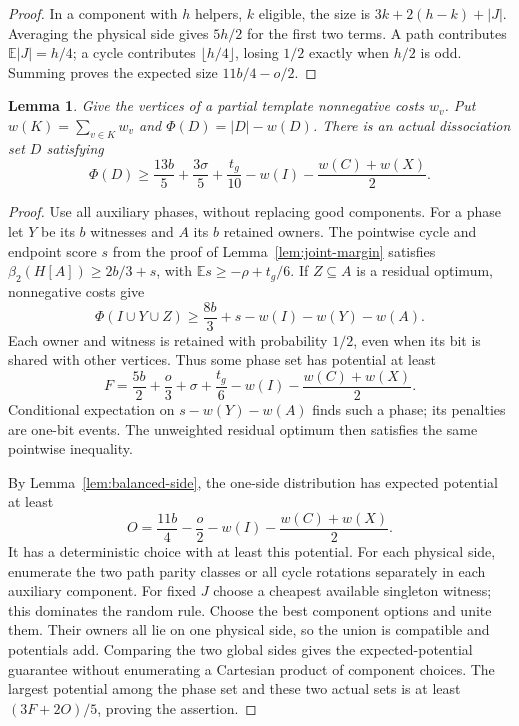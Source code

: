 \documentclass[11pt]{article}
\newtheorem{lemma}[theorem]{Lemma}
\newcommand{\diss}{\beta_2}
\begin{document}
\begin{proof}
In a component with $h$ helpers, $k$ eligible, the size is
$3k+2(h-k)+|J|$. Averaging the physical side gives $5h/2$ for the
first two terms. A path contributes $\mathbb E|J|=h/4$; a cycle
contributes $\lfloor h/4\rfloor$, losing $1/2$ exactly when $h/2$
is odd. Summing proves the expected size $11b/4-o/2$.
\end{proof}

\begin{lemma}\label{lem:vertex-penalties}
Give the vertices of a partial template nonnegative costs $w_v$. Put
$w(K)=\sum_{v\in K}w_v$ and $\Phi(D)=|D|-w(D)$.
There is an actual dissociation set $D$ satisfying
\[
 \Phi(D)\ge\frac{13b}{5}+\frac{3\sigma}{5}+\frac{t_g}{10}
                   -w(I)-\frac{w(C)+w(X)}2.
\]
\end{lemma}
\begin{proof}
Use all auxiliary phases, without replacing good components. For a phase
let $Y$ be its $b$ witnesses and $A$ its $b$ retained owners. The pointwise
cycle and endpoint score $s$ from the proof of Lemma~\ref{lem:joint-margin} satisfies
$\diss(H[A])\ge2b/3+s$, with $\mathbb Es\ge-\rho+t_g/6$.
If $Z\subseteq A$ is a residual optimum, nonnegative costs give
\[
 \Phi(I\cup Y\cup Z)\ge\frac{8b}{3}+s-w(I)-w(Y)-w(A).
\]
Each owner and witness is retained with probability $1/2$, even when its
bit is shared with other vertices. Thus some phase set has potential
at least
\[
 F=\frac{5b}{2}+\frac o3+\sigma+\frac{t_g}{6}
                   -w(I)-\frac{w(C)+w(X)}2.
\]
Conditional expectation on $s-w(Y)-w(A)$ finds such a phase; its penalties
are one-bit events. The unweighted residual optimum then satisfies the
same pointwise inequality.

By Lemma~\ref{lem:balanced-side}, the one-side distribution has expected
potential at least
\[
 O=\frac{11b}{4}-\frac o2-w(I)-\frac{w(C)+w(X)}2.
\]
It has a deterministic choice with at least this potential. For each
physical side, enumerate the two path parity classes or all cycle
rotations separately in each auxiliary component. For fixed $J$ choose
a cheapest available singleton witness; this dominates the random rule.
Choose the best component options and unite them. Their owners all lie
on one physical side, so the union is compatible and potentials add.
Comparing the two global sides gives the expected-potential guarantee
without enumerating a Cartesian product of component choices.
The largest potential among the phase set and these two actual sets
is at least $(3F+2O)/5$, proving the assertion.
\end{proof}
\end{document}
